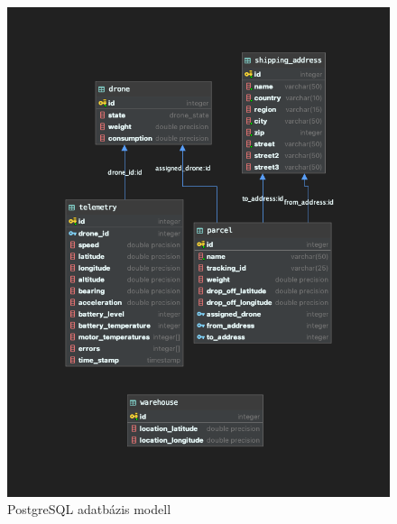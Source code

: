 \begin{figure}[h]
    \centering
    \includegraphics[scale=0.4]{images/postgres.png}
    \caption{PostgreSQL adatbázis modell}
    \label{fig:postgres}
\end{figure}



